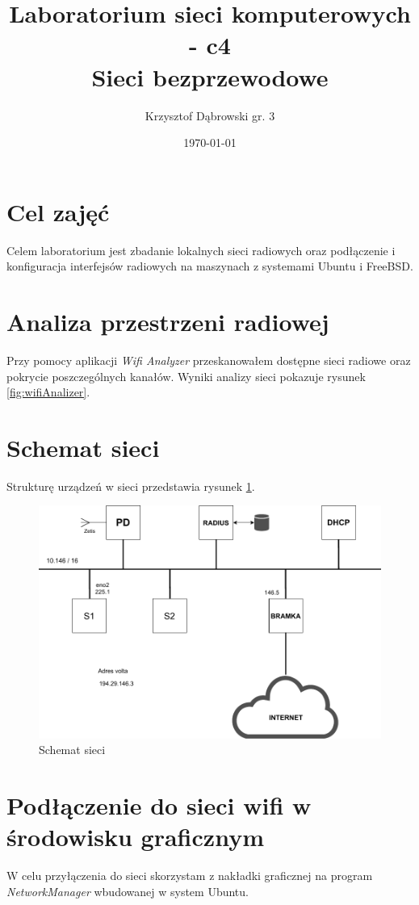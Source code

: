 \documentclass{mwart} %
\title{Laboratorium sieci komputerowych - c4 \\ Sieci bezprzewodowe}
\author{Krzysztof Dąbrowski gr. 3}
\date{\today}
\begin{document}
\maketitle{}
\tableofcontents{}

\section{Cel zajęć}
Celem laboratorium jest zbadanie lokalnych sieci radiowych oraz podłączenie i konfiguracja interfejsów radiowych na maszynach z systemami Ubuntu i FreeBSD.

\section{Analiza przestrzeni radiowej}
Przy pomocy aplikacji \textit{Wifi Analyzer} przeskanowałem dostępne sieci radiowe oraz pokrycie poszczególnych kanałów.
Wyniki analizy sieci pokazuje rysunek \ref{fig:wifiAnalizer}.


\section{Schemat sieci}
Strukturę urządzeń w sieci przedstawia rysunek \ref{fig:SchematSieci}.

\begin{figure}[H]
  \centering
  \includegraphics[width=\textwidth]{SchematSieci}
  
  \caption{Schemat sieci}
  \label{fig:SchematSieci}
\end{figure}

\section{Podłączenie do sieci wifi w środowisku graficznym}
W celu przyłączenia do sieci skorzystam z nakładki graficznej na program \textit{NetworkManager} wbudowanej w system Ubuntu.
\end{document}
